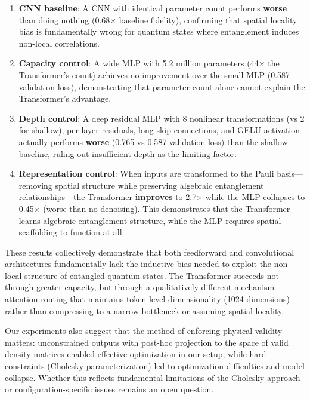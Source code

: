 \documentclass[11pt]{article}
\begin{document}
\begin{enumerate}
\item \textbf{CNN baseline}: A CNN with identical parameter count performs \textbf{worse} than doing nothing (0.68× baseline fidelity), confirming that spatial locality bias is fundamentally wrong for quantum states where entanglement induces non-local correlations.

\item \textbf{Capacity control}: A wide MLP with 5.2 million parameters (44× the Transformer's count) achieves no improvement over the small MLP (0.587 validation loss), demonstrating that parameter count alone cannot explain the Transformer's advantage.

\item \textbf{Depth control}: A deep residual MLP with 8 nonlinear transformations (vs 2 for shallow), per-layer residuals, long skip connections, and GELU activation actually performs \textbf{worse} (0.765 vs 0.587 validation loss) than the shallow baseline, ruling out insufficient depth as the limiting factor.

\item \textbf{Representation control}: When inputs are transformed to the Pauli basis—removing spatial structure while preserving algebraic entanglement relationships—the Transformer \textbf{improves} to 2.7× while the MLP collapses to 0.45× (worse than no denoising). This demonstrates that the Transformer learns algebraic entanglement structure, while the MLP requires spatial scaffolding to function at all.
\end{enumerate}

These results collectively demonstrate that both feedforward and convolutional architectures fundamentally lack the inductive bias needed to exploit the non-local structure of entangled quantum states. The Transformer succeeds not through greater capacity, but through a qualitatively different mechanism—attention routing that maintains token-level dimensionality (1024 dimensions) rather than compressing to a narrow bottleneck or assuming spatial locality.

Our experiments also suggest that the method of enforcing physical validity matters: unconstrained outputs with post-hoc projection to the space of valid density matrices enabled effective optimization in our setup, while hard constraints (Cholesky parameterization) led to optimization difficulties and model collapse. Whether this reflects fundamental limitations of the Cholesky approach or configuration-specific issues remains an open question.
\end{document}
